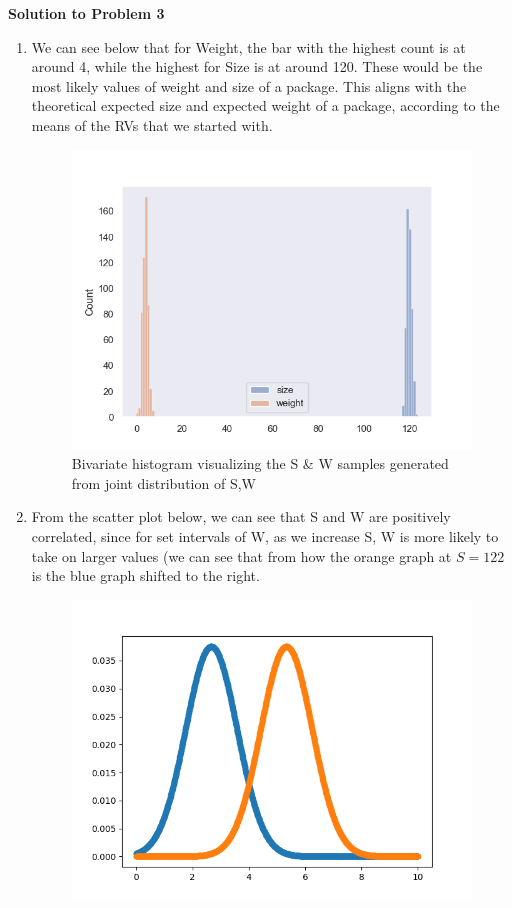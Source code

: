\documentclass{harvardml}
\theoremstyle{definition}
\theoremstyle{plain}
\begin{document}
\textbf{Solution to Problem 3}
\begin{enumerate}
\item
    We can see below that for Weight, the bar with the highest count is at around 4, while the highest for Size is at around 120. These would be the most likely values of weight and size of a package. This aligns with the theoretical expected size and expected weight of a package, according to the means of the RVs that we started with.\\
    \begin{figure}[h]
        \centering
        \includegraphics{images/q-3-1.png}
        \caption{Bivariate histogram visualizing the S \& W samples generated from joint distribution of S,W}
        \label{fig:q-3-1}
    \end{figure}
    \pagebreak
\item
    From the scatter plot below, we can see that S and W are positively correlated, since for set intervals of W, as we increase S, W is more likely to take on larger values (we can see that from how the orange graph at $S=122$ is the blue graph shifted to the right.\\
    \begin{figure}[h]
        \centering
        \includegraphics{images/q-3-2.png}

\end{figure}
\end{enumerate}
\end{document}
